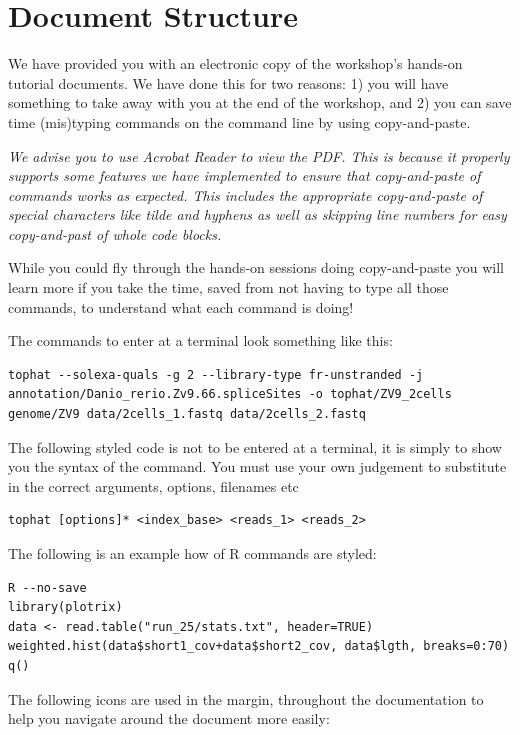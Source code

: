 \section{Document Structure}
We have provided you with an electronic copy of the workshop's hands-on tutorial documents.
We have done this for two reasons: 1) you will have something to take away with you at the 
end of the workshop, and 2) you can save time (mis)typing commands on the command line by using
copy-and-paste.

\emph{We advise you to use Acrobat Reader to view the PDF. This is because it
properly supports some features we have implemented to ensure that
copy-and-paste of commands works as expected. This includes the appropriate
copy-and-paste of special characters like tilde and hyphens as well as skipping
line numbers for easy copy-and-past of whole code blocks.}

\begin{warning}
While you could fly through the hands-on sessions doing
copy-and-paste you will learn more if you take the time, saved from not having to type all those
commands, to understand what each command is doing!
\end{warning}

The commands to enter at a terminal look something like this:
\begin{lstlisting}
tophat --solexa-quals -g 2 --library-type fr-unstranded -j annotation/Danio_rerio.Zv9.66.spliceSites -o tophat/ZV9_2cells genome/ZV9 data/2cells_1.fastq data/2cells_2.fastq
\end{lstlisting}  

The following styled code is not to be entered at a terminal, it is simply to
show you the syntax of the command. You must use your own judgement to
substitute in the correct arguments, options, filenames etc

\begin{lstlisting}[style=command_syntax]
tophat [options]* <index_base> <reads_1> <reads_2>
\end{lstlisting}

The following is an example how of R commands are styled:

\begin{lstlisting}[style=R]
R --no-save
library(plotrix) 
data <- read.table("run_25/stats.txt", header=TRUE) 
weighted.hist(data$short1_cov+data$short2_cov, data$lgth, breaks=0:70)
q()
\end{lstlisting}

The following icons are used in the margin, throughout the documentation to help
you navigate around the document more easily:

